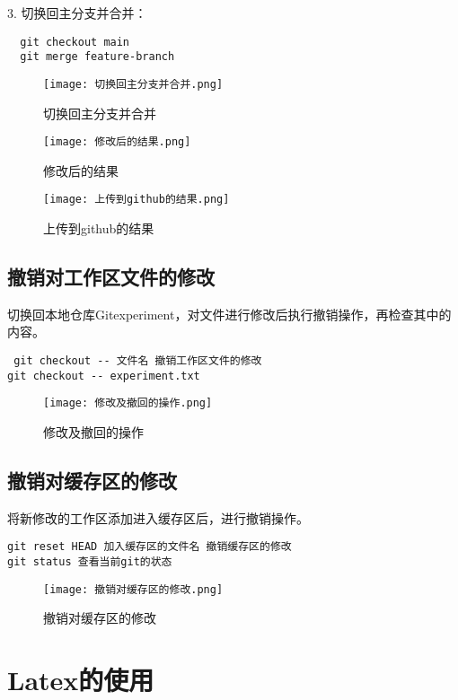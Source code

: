 \documentclass[a4paper, 12pt]{article}
\begin{document}
  3. 切换回主分支并合并：
  \begin{verbatim}
  git checkout main
  git merge feature-branch
  \end{verbatim}

   \begin{figure}[H]
  \centering
 \texttt{[image: 切换回主分支并合并.png]}
  \caption{切换回主分支并合并}
   \end{figure}

  \begin{figure}[H]
  \centering
 \texttt{[image: 修改后的结果.png]}
  \caption{修改后的结果}
   \end{figure}

   \begin{figure}[H]
  \centering
 \texttt{[image: 上传到github的结果.png]}
  \caption{上传到github的结果}
   \end{figure}
   
  \subsection{撤销对工作区文件的修改}
  切换回本地仓库Gitexperiment，对文件进行修改后执行撤销操作，再检查其中的内容。
   \begin{verbatim}
 git checkout -- 文件名 撤销工作区文件的修改
git checkout -- experiment.txt 
  \end{verbatim}
  
 \begin{figure}[H]
  \centering
 \texttt{[image: 修改及撤回的操作.png]}
  \caption{修改及撤回的操作}
   \end{figure}

 \subsection{撤销对缓存区的修改}
  将新修改的工作区添加进入缓存区后，进行撤销操作。
   \begin{verbatim}
git reset HEAD 加入缓存区的文件名 撤销缓存区的修改
git status 查看当前git的状态
  \end{verbatim}
  
 \begin{figure}[H]
  \centering
 \texttt{[image: 撤销对缓存区的修改.png]}
  \caption{撤销对缓存区的修改}
   \end{figure}

\section{Latex的使用}
\end{document}
